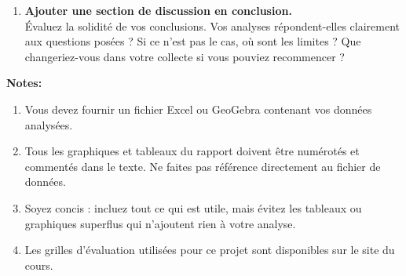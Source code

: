 \documentclass[11pt,french]{article}
\begin{document}
\begin{enumerate}
\begin{enumerate}
Ensuite, approfondissez vos réponses grâce à des méthodes d’inférence statistique. Précisez les outils statistiques utilisés pour chaque question. Interprétez vos résultats en tenant compte du contexte. Pour chaque analyse, validez les hypothèses du modèle utilisé (normalité ? variances égales ? taille d’échantillon suffisante ? etc.). Si les hypothèses ne sont pas respectées, envisagez une transformation des variables ou une autre méthode d’analyse.
\item[-] \textbf{Ajouter une section de discussion en conclusion.}\\
Évaluez la solidité de vos conclusions. Vos analyses répondent-elles clairement aux questions posées ? Si ce n’est pas le cas, où sont les limites ? Que changeriez-vous dans votre collecte si vous pouviez recommencer ?
\end{enumerate}


\newpage

\vspace{0.1in}
\vspace{0.1in}
\textbf{Notes: }
\begin{enumerate}[$\bullet$]
\item Vous devez fournir un fichier Excel ou GeoGebra contenant vos données analysées.
\item Tous les graphiques et tableaux du rapport doivent être numérotés et commentés dans le texte. Ne faites pas référence directement au fichier de données.
\item Soyez concis : incluez tout ce qui est utile, mais évitez les tableaux ou graphiques superflus qui n’ajoutent rien à votre analyse.
\item Les grilles d’évaluation utilisées pour ce projet sont disponibles sur le site du cours.
\end{enumerate}



\end{enumerate}
\end{document}
